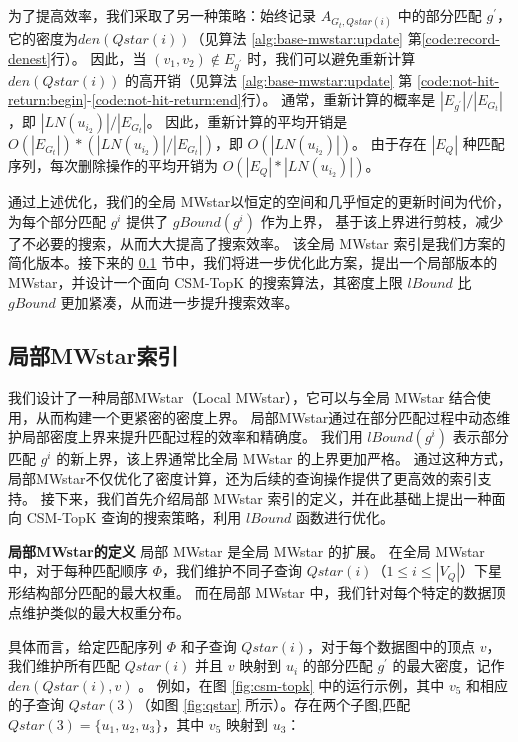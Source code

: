      为了提高效率，我们采取了另一种策略：始终记录 $A_{G_t, Qstar(i)}$ 中的部分匹配 $g^\prime$，它的密度为$den(Qstar(i))$（见算法 \ref{alg:base-mwstar:update} 第\ref{code:record-denest}行）。
     因此，当 $(v_1, v_2) \notin E_{g^\prime}$ 时，我们可以避免重新计算 $den(Qstar(i))$ 的高开销（见算法 \ref{alg:base-mwstar:update}  第 \ref{code:not-hit-return:begin}-\ref{code:not-hit-return:end}行）。
     通常，重新计算的概率是 $|E_{g^\prime}|/|E_{G_t}|$，即 $|LN(u_{i_2})|/|E_{G_t}|$。
     因此，重新计算的平均开销是 $O(|E_{G_t}|)*(|LN(u_{i_2})|/|E_{G_t}|)$，即 $O(|LN(u_{i_2})|)$。
     由于存在 $|E_Q|$ 种匹配序列，每次删除操作的平均开销为 $O(|E_Q|*|LN(u_{i_2})|)$。
         
     通过上述优化，我们的全局 MWstar以恒定的空间和几乎恒定的更新时间为代价，为每个部分匹配 $g^i$ 提供了 $gBound(g^i)$ 作为上界，
     基于该上界进行剪枝，减少了不必要的搜索，从而大大提高了搜索效率。
     该全局 MWstar 索引是我们方案的简化版本。接下来的 \ref{mwstar:local} 节中，我们将进一步优化此方案，提出一个局部版本的 MWstar，并设计一个面向 CSM-TopK 的搜索算法，其密度上限 $lBound$ 比 $gBound$ 更加紧凑，从而进一步提升搜索效率。

\subsection{局部MWstar索引}
\label{mwstar:local}
我们设计了一种局部MWstar（Local MWstar），它可以与全局 MWstar 结合使用，从而构建一个更紧密的密度上界。
局部MWstar通过在部分匹配过程中动态维护局部密度上界来提升匹配过程的效率和精确度。
我们用 $lBound(g^i)$ 表示部分匹配 $g^i$ 的新上界，该上界通常比全局 MWstar 的上界更加严格。
通过这种方式，局部MWstar不仅优化了密度计算，还为后续的查询操作提供了更高效的索引支持。
接下来，我们首先介绍局部 MWstar 索引的定义，并在此基础上提出一种面向 CSM-TopK 查询的搜索策略，利用 $lBound$ 函数进行优化。


\textbf{局部MWstar的定义}
局部 MWstar 是全局 MWstar 的扩展。
在全局 MWstar 中，对于每种匹配顺序 $\Phi$，我们维护不同子查询 $Qstar(i)$（$1\leq i\leq |V_Q|$）下星形结构部分匹配的最大权重。
而在局部 MWstar 中，我们针对每个特定的数据顶点维护类似的最大权重分布。

具体而言，给定匹配序列 $\Phi$ 和子查询 $Qstar(i)$，对于每个数据图中的顶点 $v$，我们维护所有匹配 $Qstar(i)$ 并且 $v$ 映射到 $u_i$ 的部分匹配 $g^\prime$ 的最大密度，记作 $den(Qstar(i), v)$ 。
例如，在图 \ref{fig:csm-topk} 中的运行示例，其中 $v_5$ 和相应的子查询 $Qstar(3)$（如图 \ref{fig:qstar} 所示）。存在两个子图,匹配 $Qstar(3)=\{u_1, u_2, u_3\}$，其中 $v_5$ 映射到 $u_3$：

